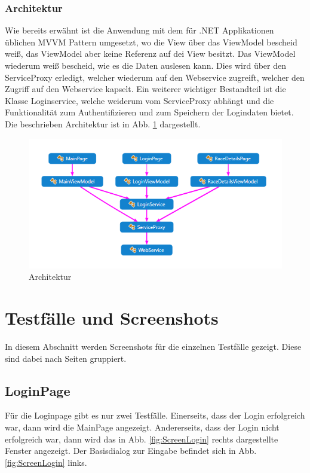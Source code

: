 \documentclass[a4paper,ngerman]{scrartcl}
\begin{document}
\subsubsection{Architektur}
Wie bereits erwähnt ist die Anwendung mit dem für .NET Applikationen üblichen MVVM Pattern umgesetzt, wo die View über das ViewModel bescheid weiß, das ViewModel aber keine Referenz auf dei View besitzt. Das ViewModel wiederum weiß bescheid, wie es die Daten auslesen kann. Dies wird über den ServiceProxy erledigt, welcher wiederum auf den Webservice zugreift, welcher den Zugriff auf den Webservice kapselt. Ein weiterer wichtiger Bestandteil ist die Klasse Loginservice, welche weiderum vom ServiceProxy abhängt und die Funktionalität zum Authentifizieren und zum Speichern der Logindaten bietet. Die beschrieben Architektur ist in Abb. \ref{fig:arch} dargestellt. 

\begin{figure}[h]
\centering
\includegraphics[width=.80\textwidth]{images/architecture}
\caption{Architektur}
\label{fig:arch}
\end{figure}

\newpage
\section{Testfälle und Screenshots}
In diesem Abschnitt werden Screenshots für die einzelnen Testfälle gezeigt. Diese sind dabei nach Seiten gruppiert.

\subsection{LoginPage}
Für die Loginpage gibt es nur zwei Testfälle. Einerseits, dass der Login erfolgreich war, dann wird die MainPage angezeigt. Andererseits, dass der Login nicht erfolgreich war, dann wird das in Abb. \ref{fig:ScreenLogin} rechts dargestellte Fenster angezeigt. Der Basisdialog zur Eingabe befindet sich in Abb. \ref{fig:ScreenLogin} links.
\end{document}
